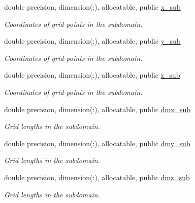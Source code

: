 \textbf{ }\par
\begin{DoxyCompactItemize}
\item 
double precision, dimension(\+:), allocatable, public \mbox{\hyperlink{namespacempi__subdomain_a978554e1520c79471ef3793ed1872b37}{x\+\_\+sub}}
\begin{DoxyCompactList}\small\item\em Coordinates of grid points in the subdomain. \end{DoxyCompactList}\item 
double precision, dimension(\+:), allocatable, public \mbox{\hyperlink{namespacempi__subdomain_a58b09abee5f1002de7b20b1b86f5c821}{y\+\_\+sub}}
\begin{DoxyCompactList}\small\item\em Coordinates of grid points in the subdomain. \end{DoxyCompactList}\item 
double precision, dimension(\+:), allocatable, public \mbox{\hyperlink{namespacempi__subdomain_aab6d78e49471a9a3db5ad9df4c3d4041}{z\+\_\+sub}}
\begin{DoxyCompactList}\small\item\em Coordinates of grid points in the subdomain. \end{DoxyCompactList}\end{DoxyCompactItemize}

\textbf{ }\par
\begin{DoxyCompactItemize}
\item 
double precision, dimension(\+:), allocatable, public \mbox{\hyperlink{namespacempi__subdomain_a56af1740899dc9df6868e5e71a0884a5}{dmx\+\_\+sub}}
\begin{DoxyCompactList}\small\item\em Grid lengths in the subdomain. \end{DoxyCompactList}\item 
double precision, dimension(\+:), allocatable, public \mbox{\hyperlink{namespacempi__subdomain_ae44efbff9669bfad03a79ab41b5e8ace}{dmy\+\_\+sub}}
\begin{DoxyCompactList}\small\item\em Grid lengths in the subdomain. \end{DoxyCompactList}\item 
double precision, dimension(\+:), allocatable, public \mbox{\hyperlink{namespacempi__subdomain_afb6341d7362587d6fd0a06fe78ba4e3f}{dmz\+\_\+sub}}
\begin{DoxyCompactList}\small\item\em Grid lengths in the subdomain. \end{DoxyCompactList}\end{DoxyCompactItemize}

